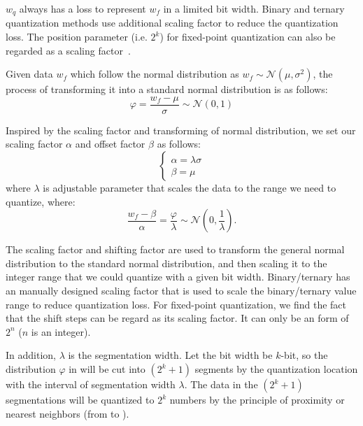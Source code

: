 $w_q$ always has a loss to represent $w_f$ in a limited bit width.
Binary and ternary quantization methods use additional scaling factor to reduce the quantization loss. The position parameter (i.e. $2^k$) for fixed-point quantization can also be regarded as a scaling factor~\cite{zhou2016dorefa,gysel2016hardware}. 

Given data $w_f$ which follow the normal distribution as $w_f\sim \mathcal{N}(\mu,\sigma^2)$, the process of transforming it into a standard normal distribution is as follows:
\begin{equation}
    \label{eqn:snd}
    \varphi=\frac{w_f-\mu}{\sigma}\sim \mathcal{N}(0,1)
\end{equation}

Inspired by the scaling factor and transforming of normal distribution, we set our scaling factor $\alpha$ and offset factor $\beta$ as follows:
\begin{equation}
    \begin{cases}
    \alpha=\lambda \sigma\\
    \beta=\mu
    \end{cases}
\end{equation}
where $\lambda$ is adjustable parameter that scales the data to the range we need to quantize, where:
\begin{equation}
\label{eqn:distribution_scale}
 \frac{w_f-\beta}{\alpha}=\frac{\varphi}{\lambda}\sim \mathcal{N}(0,\frac{1}{\lambda}).   
\end{equation}

The scaling factor and shifting factor are used to transform the general normal distribution to the standard normal distribution, and then scaling it to the integer range that we could quantize with a given bit width. Binary/ternary has an manually designed scaling factor that is used to scale the binary/ternary value range to reduce quantization loss. For fixed-point quantization, we find the fact that the shift steps can be regard as its scaling factor. It can only be an form of $2^n$ ($n$ is an integer).

In addition, $\lambda$ is the segmentation width. 
Let the bit width be $k$-bit, so the distribution $\varphi$ in  will be cut into $(2^k+1)$ segments by the quantization location with the interval of segmentation width $\lambda$.
The data in the $(2^k+1)$ segmentations will be quantized to $2^k$ numbers by the principle of proximity or nearest neighbors (from  to ).


